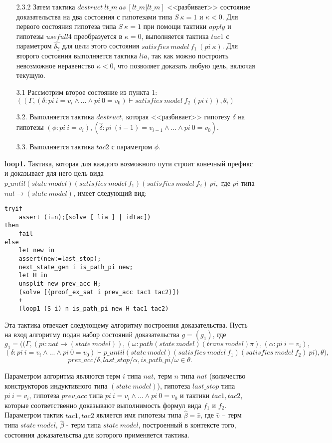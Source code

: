 \documentclass[12pt]{article}
\begin{document}
\begin{enumerate}
\item[2.3.2] Затем тактика $destruct\ lt\_m\ as\ [lt\_m| lt\_m]$  <<разбивает>> состояние доказательства на два состояния с гипотезами типа $S\ \kappa = 1$ и $\kappa < 0$. 
Для первого состояния гипотеза типа $S\ \kappa = 1$ при помощи тактики $apply$ и гипотезы $usefull4$ преобразуется в $\kappa = 0$, выполняется тактика $tac1$ с параметром $\hat{\delta_2}$ для цели этого состояния $satisfies\ model\ f_1\ (pi\ \kappa)$.
Для второго состояния выполняется тактика $lia$, так как можно построить невозможное неравенство $\kappa<0$, что позволяет доказать любую цель, включая текущую.
\item[3.1] Рассмотрим второе состояние из пункта 1:
$((\Gamma, (\delta : pi\ i = v_i \wedge ... \wedge pi\ 0 = v_0) \vdash satisfies\ model\ f_2\ (pi\ i)), \theta_i)$
\item[3.2.] Выполняется тактика $destruct$, которая <<разбивает>> гипотезу $\delta$ на гипотезы $(\phi:pi\ i = v_i),(\hat{\delta} : pi\ (i-1) = v_{i-1} \wedge ... \wedge pi\ 0 = v_0)$.
\item[3.3.] Выполняется тактика $tac2$ с параметром $\phi$.
\end{enumerate}


\textbf{loop1.}
Тактика, которая для каждого возможного пути строит конечный префикс и доказывает для него цель вида 
$p\_until (state\ model) (satisfies\ model\ f_1) (satisfies\ model\ f_2)\ pi,$ где $pi$ типа $nat \xrightarrow{} (state\ model)$, имеет следующий вид:

\begin{verbatim}
tryif 
    assert (i=n);[solve [ lia ] | idtac])
then 
    fail
else
    let new in
    assert(new:=last_stop);
    next_state_gen i is_path_pi new;
    let H in
    unsplit new prev_acc H;
    (solve [(proof_ex_sat i prev_acc tac1 tac2)]) 
    + 
    (loop1 (S i) n is_path_pi new H tac1 tac2)
\end{verbatim}

Эта тактика отвечает следующему алгоритму построения доказательства.
Пусть на вход алгоритму подан набор состояний доказательства $g = (g_1)$, где
$$g_1 = ((\Gamma,(pi:nat \xrightarrow{} (state\ model)),(\omega:path (state\ model) (trans\ model) \pi),(\alpha:pi\ i = v_i),$$
$$ (\delta : pi\ i = v_i \wedge ... \wedge pi\ 0 = v_0) \vdash p\_until (state\ model) (satisfies\ model\ f_1) (satisfies\ model\ f_2)\ pi),\theta),$$
$$prev\_acc/\delta,last\_stop/\alpha,is\_path\_pi/\omega \in \theta.$$

Параметром алгоритма являются терм $i$ типа $nat$, терм $n$ типа $nat$ (количество конструкторов индуктивного типа $(state\ model)$), гипотеза $last\_stop$ типа $pi\ i = v_i$, гипотеза $prev\_acc$ типа $pi\ i = v_{i} \wedge ... \wedge pi\ 0 = v_0$ и тактики $tac1,tac2$, которые соответственно доказывают выполнимость формул вида $f_1$ и $f_2$. Параметром тактик $tac1, tac2$ является имя гипотезы типа  $\hat{\beta} = \hat{v}$, где $\hat{v}$ -- терм типа $state\ model$, $\hat{\beta}$ - терм типа $state\ model$, построенный в контексте того, состояния доказательства для которого применяется тактика.
\end{document}
